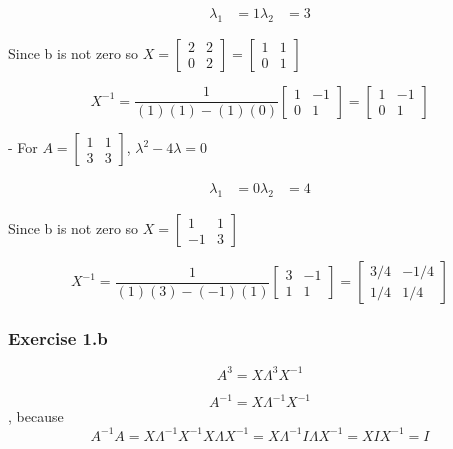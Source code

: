 \documentclass{article}
\begin{document}
\[
    \begin{aligned}
        \lambda_1 & = 1
        \lambda_2 & = 3
    \end{aligned}
\]

Since b is not zero so \( X = \begin{bmatrix} 2 & 2 \\ 0 & 2 \end{bmatrix} = \begin{bmatrix} 1 & 1 \\ 0 & 1 \end{bmatrix} \)

\[
    X^{-1} = \frac{1}{(1)(1) - (1)(0)} \begin{bmatrix} 1 & -1 \\ 0 & 1 \end{bmatrix} = \begin{bmatrix} 1 & -1 \\ 0 & 1 \end{bmatrix}
\]

- For \( A = \begin{bmatrix} 1 & 1 \\ 3 & 3 \end{bmatrix} \), \( \lambda^2 - 4\lambda = 0 \)

\[
    \begin{aligned}
        \lambda_1 & = 0
        \lambda_2 & = 4
    \end{aligned}
\]

Since b is not zero so \( X = \begin{bmatrix} 1 & 1 \\ -1 & 3 \end{bmatrix} \)

\[
    X^{-1} = \frac{1}{(1)(3) - (-1)(1)} \begin{bmatrix} 3 & -1 \\ 1 & 1 \end{bmatrix} = \begin{bmatrix} 3/4 & -1/4 \\ 1/4 & 1/4 \end{bmatrix}
\]

\subsubsection{Exercise 1.b}
\[
    A^{3} = X\Lambda^{3}X^{-1}
\]

\[ A^{-1} = X \Lambda^{-1} X^{-1} \], because \[ A^{-1} A = X \Lambda^{-1} X^{-1} X \Lambda X^{-1} = X \Lambda^{-1} I \Lambda X^{-1} = X I X^{-1} = I \]
\end{document}
